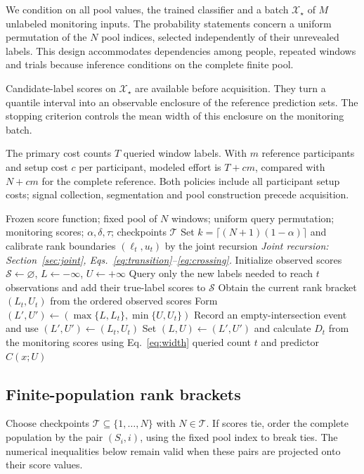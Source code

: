 \documentclass[preprint,12pt]{elsarticle}
\begin{document}
We condition on all pool values, the trained classifier and a batch $\mathcal X_\star$ of $M$ unlabeled monitoring inputs. The probability statements concern a uniform permutation of the $N$ pool indices, selected independently of their unrevealed labels. This design accommodates dependencies among people, repeated windows and trials because inference conditions on the complete finite pool.

Candidate-label scores on $\mathcal X_\star$ are available before acquisition. They turn a quantile interval into an observable enclosure of the reference prediction sets. The stopping criterion controls the mean width of this enclosure on the monitoring batch.

The primary cost counts $T$ queried window labels. With $m$ reference participants and setup cost $c$ per participant, modeled effort is $T+cm$, compared with $N+cm$ for the complete reference. Both policies include all participant setup costs; signal collection, segmentation and pool construction precede acquisition.


\begin{algorithm}[t]
\caption{Joint rank calibration for a fixed reference pool}\label{alg:jrc}
\begin{algorithmic}[1]
\Require Frozen score function; fixed pool of $N$ windows; uniform query permutation; monitoring scores; $\alpha,\delta,\tau$; checkpoints $\mathcal T$
\State Set $k=\lceil(N+1)(1-\alpha)\rceil$ and calibrate rank boundaries $(\ell_t,u_t)$ by the joint recursion
\Statex \hspace{\algorithmicindent}\textit{Joint recursion: Section~\ref{sec:joint}, Eqs.~\eqref{eq:transition}--\eqref{eq:crossing}.}
\State Initialize observed scores $\mathcal S\gets\varnothing$, $L\gets-\infty$, $U\gets+\infty$
\State Query only the new labels needed to reach $t$ observations and add their true-label scores to $\mathcal S$
\State Obtain the current rank bracket $(L_t,U_t)$ from the ordered observed scores
\State Form $(L',U')\gets(\max\{L,L_t\},\min\{U,U_t\})$
\State Record an empty-intersection event and use $(L',U')\gets(L_t,U_t)$
\EndIf
\State Set $(L,U)\gets(L',U')$ and calculate $D_t$ from the monitoring scores using Eq.~\eqref{eq:width}
\State \Return queried count $t$ and predictor $C(x;U)$
\EndIf
\EndFor
\end{algorithmic}
\end{algorithm}

\subsection{Finite-population rank brackets}
Choose checkpoints $\mathcal T\subseteq\{1,\ldots,N\}$ with $N\in\mathcal T$. If scores tie, order the complete population by the pair $(S_i,i)$, using the fixed pool index to break ties. The numerical inequalities below remain valid when these pairs are projected onto their score values.
\end{document}
